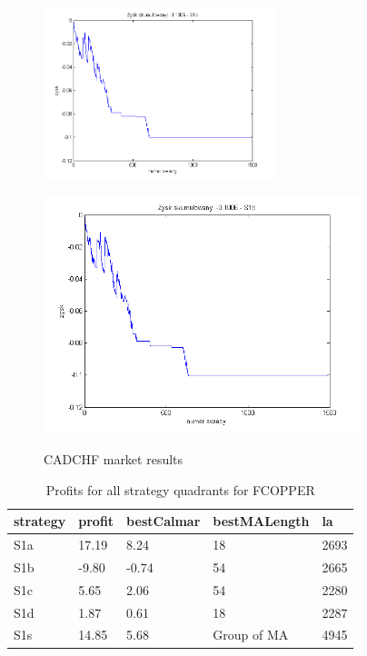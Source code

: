 \documentclass{tewiart}
\begin{document}
\begin{figure}[h]
\begin{minipage}{\linewidth}
\centering
\includegraphics[width=0.6\textwidth]{images/cadchfS1d.png}
\label{mansard}
\end{minipage}
\begin{minipage}{.49\linewidth}
\centering
\includegraphics[width=0.82\textwidth]{images/cadchfS1s.png}
\label{mansard}
\end{minipage}
\caption{CADCHF market results}
\end{figure}
\newpage
\begin{table}[!t]
\caption{Profits for all strategy quadrants for FCOPPER}
 \begin{center}
 \begin{tabular}{|l|l|l|l|l|}
 \hline \textbf{strategy} & \textbf{profit} & \textbf{bestCalmar} & \textbf{bestMALength} & \textbf{la} \\ \hline
S1a & 17.19 & 8.24 & 18 & 2693\\ \hline
S1b & -9.80 & -0.74 & 54 & 2665\\ \hline
S1c & 5.65 & 2.06 & 54 & 2280\\ \hline
S1d & 1.87 & 0.61 & 18 & 2287\\ \hline
S1s & 14.85 & 5.68 & Group of MA & 4945\\
\hline \end{tabular}
 \end{center}
 \end{table}
\end{document}
